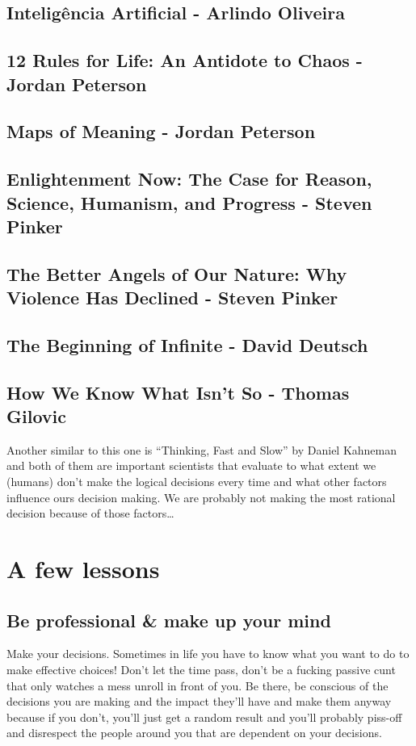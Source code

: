 \subsection{Inteligência Artificial - Arlindo Oliveira}

\subsection{12 Rules for Life: An Antidote to Chaos - Jordan Peterson}

\subsection{Maps of Meaning - Jordan Peterson}

\subsection{Enlightenment Now: The Case for Reason, Science, Humanism, and Progress - Steven Pinker}

\subsection{The Better Angels of Our Nature: Why Violence Has Declined - Steven Pinker}

\subsection{The Beginning of Infinite - David Deutsch}

\subsection{How We Know What Isn't So - Thomas Gilovic}

Another similar to this one is ``Thinking, Fast and Slow'' by Daniel Kahneman and both of them are important scientists that evaluate to what extent we (humans) don't make the logical decisions every time and what other factors influence ours decision making. We are probably not making the most rational decision because of those factors\dots






\section{A few lessons}

\subsection{Be professional \& make up your mind}
Make your decisions. Sometimes in life you have to know what you want to do to make effective choices! Don't let the time pass, don't be a fucking passive cunt that only watches a mess unroll in front of you. Be there, be conscious of the decisions you are making and the impact they'll have and make them anyway because if you don't, you'll just get a random result and you'll probably piss-off and disrespect the people around you that are dependent on your decisions.


